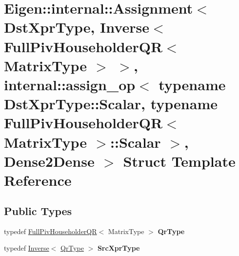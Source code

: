 \hypertarget{struct_eigen_1_1internal_1_1_assignment_3_01_dst_xpr_type_00_01_inverse_3_01_full_piv_householde4c13323440da58b97e1a51d313048bfd}{}\section{Eigen\+::internal\+::Assignment$<$ Dst\+Xpr\+Type, Inverse$<$ Full\+Piv\+Householder\+QR$<$ Matrix\+Type $>$ $>$, internal\+::assign\+\_\+op$<$ typename Dst\+Xpr\+Type\+::Scalar, typename Full\+Piv\+Householder\+QR$<$ Matrix\+Type $>$\+::Scalar $>$, Dense2\+Dense $>$ Struct Template Reference}
\label{struct_eigen_1_1internal_1_1_assignment_3_01_dst_xpr_type_00_01_inverse_3_01_full_piv_householde4c13323440da58b97e1a51d313048bfd}
\subsection*{Public Types}
\begin{DoxyCompactItemize}
\item 
\mbox{\label{struct_eigen_1_1internal_1_1_assignment_3_01_dst_xpr_type_00_01_inverse_3_01_full_piv_householde4c13323440da58b97e1a51d313048bfd_aaeda8a54982b17fc75011bef790c6193}} 
typedef \mbox{\hyperlink{class_eigen_1_1_full_piv_householder_q_r}{Full\+Piv\+Householder\+QR}}$<$ Matrix\+Type $>$ {\bfseries Qr\+Type}
\item 
\mbox{\label{struct_eigen_1_1internal_1_1_assignment_3_01_dst_xpr_type_00_01_inverse_3_01_full_piv_householde4c13323440da58b97e1a51d313048bfd_a70436cda4afe15db94d65a1e8f887f53}} 
typedef \mbox{\hyperlink{class_eigen_1_1_inverse}{Inverse}}$<$ \mbox{\hyperlink{class_eigen_1_1_full_piv_householder_q_r}{Qr\+Type}} $>$ {\bfseries Src\+Xpr\+Type}
\end{DoxyCompactItemize}

